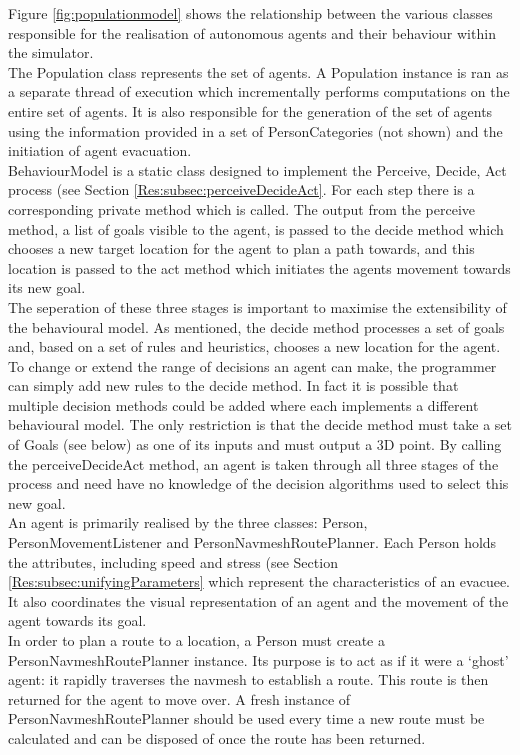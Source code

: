 Figure \ref{fig:populationmodel} shows the relationship between the various classes responsible
for the realisation of autonomous agents and their behaviour within the simulator.
\\
The Population class represents the set of agents. A Population instance is ran as a separate thread of execution which
incrementally performs computations on the entire set of agents. It is also responsible
for the generation of the set of agents using the information provided in a set of PersonCategories (not shown) and the initiation
of agent evacuation.
\\
BehaviourModel is a static class designed to implement the Perceive, Decide, Act process (see Section \ref{Res:subsec:perceiveDecideAct}. For each step there is a corresponding 
private method which is called. The output from the perceive method, a list of goals visible to the agent, is passed to the decide method
which chooses a new target location for the agent to plan a path towards, and this location is passed to the act method which initiates the agents
movement towards its new goal.
\\
The seperation of these three stages is important to maximise the extensibility of the behavioural model. As mentioned, the decide method processes a set of
goals and, based on a set of rules and heuristics, chooses a new location for the agent. To change or extend the range of decisions an agent can make,
the programmer can simply add new rules to the decide method. In fact it is possible that multiple decision methods could be added where each implements
a different behavioural model. The only restriction is that the decide method must take a set of Goals (see below) as one of its inputs and must output a 3D point.
By calling the perceiveDecideAct method, an agent is taken through all three stages of the process and need have no knowledge of the decision algorithms used to select this new goal.
\\

An agent is primarily realised by the three classes: Person, PersonMovementListener and PersonNavmeshRoutePlanner. 
Each Person holds the attributes, including speed and stress (see Section \ref{Res:subsec:unifyingParameters} which represent the characteristics of 
an evacuee. It also coordinates the visual representation of an agent and the movement of the agent towards its goal.
\\
In order to plan a route to a location, a Person must create a PersonNavmeshRoutePlanner instance. Its purpose is to act 
as if it were a `ghost' agent: it rapidly traverses the navmesh to establish a route. This route is then returned for the 
agent to move over. A fresh instance of PersonNavmeshRoutePlanner should be used every time a new route must be calculated and can be disposed
of once the route has been returned.
